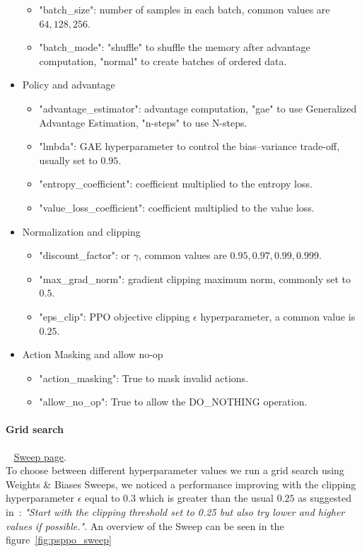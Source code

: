 \documentclass[11pt, a4paper, hidelinks]{report}
\begin{document}
\begin{itemize}
\begin{itemize}
		\item "batch\_size": number of samples in each batch, common values are $64, 128, 256$.
		\item "batch\_mode": "shuffle" to shuffle the memory after advantage computation, "normal" to create batches of ordered data.
	\end{itemize}
	\item Policy and advantage
	\begin{itemize}
		\item "advantage\_estimator": advantage computation, "gae" to use Generalized Advantage Estimation, "n-steps" to use N-steps.
		\item "lmbda": GAE hyperparameter to control the bias–variance trade-off, usually set to $0.95$.
		\item "entropy\_coefficient": coefficient multiplied to the entropy loss.
		\item "value\_loss\_coefficient": coefficient multiplied to the value loss.
	\end{itemize}
	\item Normalization and clipping
	\begin{itemize}
		\item "discount\_factor": or $\gamma$, common values are $0.95, 0.97, 0.99, 0.999$.
		\item "max\_grad\_norm": gradient clipping maximum norm, commonly set to $0.5$.
		\item "eps\_clip": PPO objective clipping $\epsilon$ hyperparameter, a common value is $0.25$.
	\end{itemize}
	\item Action Masking and allow no-op
	\begin{itemize}
		\item "action\_masking": True to mask invalid actions.
		\item "allow\_no\_op": True to allow the DO\_NOTHING operation.
	\end{itemize}
\end{itemize}

\paragraph{Grid search}\label{par:psppo_grid_search}
~\newline
\href{https://wandb.ai/lomb/flatland-challenge-lorem-ipsum-dolor-sit-amet/sweeps/5nhm3coj}{Sweep page}.\\

To choose between different hyperparameter values we run a grid search using Weights \& Biases Sweeps, we noticed a performance improving with the clipping hyperparameter $\epsilon$ equal to $0.3$ which is greater than the usual $0.25$ as suggested in~\citep{ppo-implementation-2}: \textit{"Start with the clipping threshold set to 0.25 but also try lower and higher values if possible."}.
An overview of the Sweep can be seen in the figure~\ref{fig:psppo_sweep}
\end{document}
